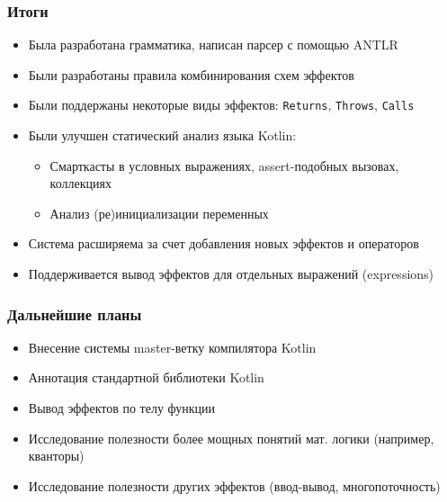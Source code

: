 \documentclass{beamer}
\newcommand{\code}[1]{\texttt{#1}}
\begin{document}
\begin{frame}[fragile, t]\frametitle{Итоги}
    \begin{itemize}
        \item Была разработана грамматика, написан парсер с помощью ANTLR
        \item Были разработаны правила комбинирования схем эффектов
        \item Были поддержаны некоторые виды эффектов: \code{Returns}, \code{Throws}, \code{Calls}
        \item Были улучшен статический анализ языка Kotlin:
            \begin{itemize}
                \item Смарткасты в условных выражениях, assert-подобных вызовах, коллекциях
                \item Анализ (ре)инициализации переменных
            \end{itemize}
       \item Система расширяема за счет добавления новых эффектов и операторов
       \item Поддерживается вывод эффектов для отдельных выражений (expressions)
    \end{itemize}
\end{frame}

\begin{frame}\frametitle{Дальнейшие планы}
    \begin{itemize}
        \item Внесение системы master-ветку компилятора Kotlin
        \item Аннотация стандартной библиотеки Kotlin
        \item Вывод эффектов по телу функции
        \item Исследование полезности более мощных понятий мат. логики (например, кванторы)
        \item Исследование полезности других эффектов (ввод-вывод, многопоточность)
    \end{itemize}
\end{frame}
\end{document}
